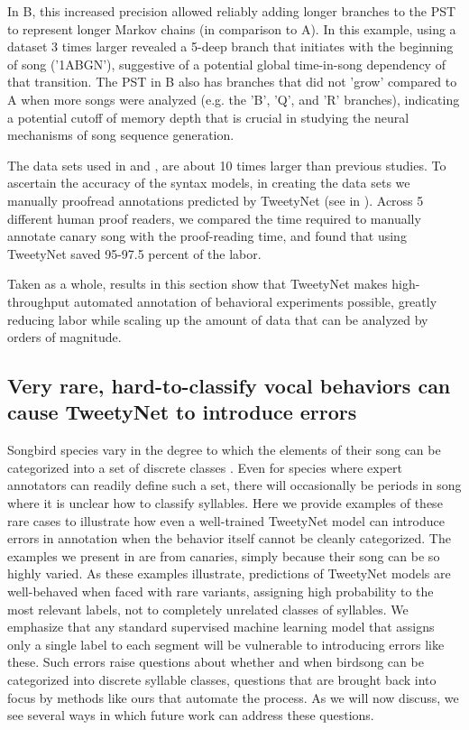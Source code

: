 \documentclass[9pt,lineno]{elife}
\begin{document}
In B, this increased precision allowed reliably adding longer branches to the PST to represent longer Markov chains (in comparison to A). In this example, using a dataset 3 times larger revealed a 5-deep branch that initiates with the beginning of song ('1ABGN'), suggestive of a potential global time-in-song dependency of that transition. The PST in B also has branches that did not 'grow' compared to A when more songs were analyzed (e.g. the 'B', 'Q', and 'R' branches), indicating a potential cutoff of memory depth that is crucial in studying the neural mechanisms of song sequence generation. 

The data sets used in  and , are about 10 times larger than previous studies. To ascertain the accuracy of the syntax models, in creating the data sets we manually proofread annotations predicted by TweetyNet (see  in ). Across 5 different human proof readers, we compared the time required to manually annotate canary song with the proof-reading time, and found that using TweetyNet saved 95-97.5 percent of the labor.

Taken as a whole, results in this section show that TweetyNet makes high-throughput automated annotation of behavioral experiments possible, greatly reducing labor while scaling up the amount of data that can be analyzed by orders of magnitude. 

\subsection{Very rare, hard-to-classify vocal behaviors can cause TweetyNet to introduce errors}
\label{rare-variants}
Songbird species vary in the degree to which 
the elements of their song can be 
categorized into a set of discrete classes 
\citep{thompson1994system, sainburgFindingVisualizingQuantifying2020}. 
Even for species where expert annotators can readily define such a set, 
there will occasionally be periods in song where it is unclear how to classify syllables. 
Here we provide examples of these rare cases 
to illustrate how even a well-trained TweetyNet model can introduce errors in annotation  
when the behavior itself cannot be cleanly categorized.
The examples we present in  are from canaries,   
simply because their song can be so highly varied. 
As these examples illustrate, 
predictions of TweetyNet models are well-behaved 
when faced with rare variants, 
assigning high probability to 
the most relevant labels, 
not to completely unrelated classes of syllables. 
We emphasize that any standard supervised machine learning model that assigns 
only a single label to each segment will be vulnerable to introducing errors like these. 
Such errors raise questions about whether and when birdsong can be categorized into discrete syllable classes, 
questions that are brought back into focus by methods like ours that automate the process.
As we will now discuss, we see several ways in which future work can address these questions.
\end{document}
